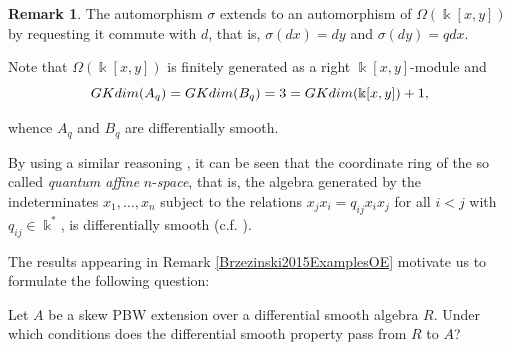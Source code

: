 \documentclass{amsart}
\theoremstyle{definition}
\newtheorem{remark}[theorem]{Remark}
\theoremstyle{remark}
\numberwithin{equation}{section}
\begin{document}
\begin{remark}
The automorphism $\sigma$ extends to an automorphism of $\Omega (\Bbbk[x, y])$ by requesting it commute with $d$, that is, $\sigma(dx) = dy$ and $\sigma(dy) = q dx$.

Note that $\Omega (\Bbbk[x, y])$ is finitely generated as a right $\Bbbk[x, y]$-module and
\[
{\rm GKdim}(A_q) = {\rm GKdim}(B_q) = 3 = {\rm GKdim}(\Bbbk[x, y]) + 1,
\]

whence $A_q$ and $B_q$ are differentially smooth.

By using a similar reasoning \cite[Corollary 4.9]{BrzezinskiLomp2018}, it can be seen that the coordinate ring of the so called {\em quantum affine} $n$-{\em space}, that is, the algebra generated by the indeterminates $x_1, \dotsc, x_n$ subject to the relations $x_j x_i = q_{ij} x_i x_j$ for all $i < j$ with $q_{ij} \in \Bbbk^{*}$, is differentially smooth (c.f. \cite[Corollary 6 and Theorem 9]{KaracuhaLomp2014}).
\end{remark}

The results appearing in Remark \ref{Brzezinski2015ExamplesOE} motivate us to formulate the following question:

\vspace{0.3cm}

 Let $A$ be a skew PBW extension over a differential smooth algebra $R$. Under which conditions does the differential smooth property pass from $R$ to $A$?
\end{document}
